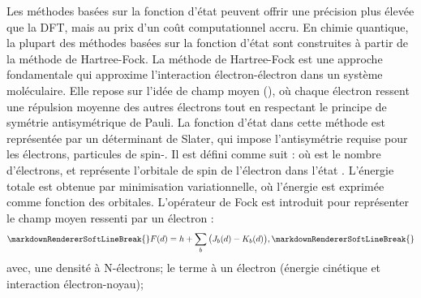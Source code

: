 {}Les méthodes basées sur la fonction d'état peuvent offrir une précision plus élevée que la DFT, mais au prix d'un coût computationnel accru. En chimie quantique, la plupart des méthodes basées sur la fonction d'état sont construites à partir de la méthode de Hartree-Fock.\markdownRendererInterblockSeparator
{}
\markdownRendererSectionEnd \markdownRendererSectionBegin
{}\markdownRendererInterblockSeparator
{}La méthode de Hartree-Fock est une approche fondamentale qui approxime l’interaction électron-électron dans un système moléculaire. Elle repose sur l'idée de champ moyen (), où chaque électron ressent une répulsion moyenne des autres électrons tout en respectant le principe de symétrie antisymétrique de Pauli.\markdownRendererInterblockSeparator
{}\markdownRendererSectionBegin
{}\markdownRendererInterblockSeparator
{}La fonction d'état dans cette méthode est représentée par un déterminant de Slater, qui impose l'antisymétrie requise pour les électrons, particules de spin-. Il est défini comme suit :\markdownRendererInterblockSeparator
{}\markdownRendererInterblockSeparator
{}où  est le nombre d'électrons, et  représente l'orbitale de spin de l'électron  dans l'état .\markdownRendererInterblockSeparator
{}
\markdownRendererSectionEnd \markdownRendererSectionBegin
{}\markdownRendererInterblockSeparator
{}L’énergie totale est obtenue par minimisation variationnelle, où l'énergie est exprimée comme fonction des orbitales. L'opérateur de Fock est introduit pour représenter le champ moyen ressenti par un électron :\markdownRendererSoftLineBreak
{}\begin{equation}\markdownRendererSoftLineBreak
{}F(d) = h + \sum_b \big(J_b(d) - K_b(d)\big) ,\markdownRendererSoftLineBreak
{}\end{equation}\markdownRendererSoftLineBreak
{}avec,\markdownRendererInterblockSeparator
{}\markdownRendererUlBeginTight
\markdownRendererUlItem {} une densité à N-électrons;\markdownRendererUlItemEnd 
\markdownRendererUlItem {} le terme à un électron (énergie cinétique et interaction électron-noyau);\markdownRendererUlItemEnd 
